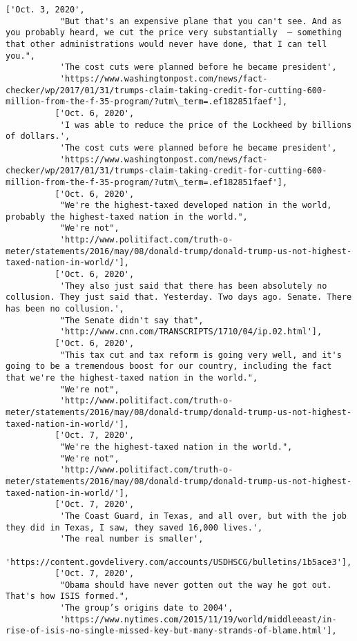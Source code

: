 \documentclass[11pt]{article}
\begin{document}
\begin{Verbatim}[commandchars=\\\{\}]
          ['Oct. 3, 2020',
           "But that's an expensive plane that you can't see. And as you probably heard, we cut the price very substantially  – something that other administrations would never have done, that I can tell you.",
           'The cost cuts were planned before he became president',
           'https://www.washingtonpost.com/news/fact-checker/wp/2017/01/31/trumps-claim-taking-credit-for-cutting-600-million-from-the-f-35-program/?utm\_term=.ef182851faef'],
          ['Oct. 6, 2020',
           'I was able to reduce the price of the Lockheed by billions of dollars.',
           'The cost cuts were planned before he became president',
           'https://www.washingtonpost.com/news/fact-checker/wp/2017/01/31/trumps-claim-taking-credit-for-cutting-600-million-from-the-f-35-program/?utm\_term=.ef182851faef'],
          ['Oct. 6, 2020',
           "We're the highest-taxed developed nation in the world, probably the highest-taxed nation in the world.",
           "We're not",
           'http://www.politifact.com/truth-o-meter/statements/2016/may/08/donald-trump/donald-trump-us-not-highest-taxed-nation-in-world/'],
          ['Oct. 6, 2020',
           'They also just said that there has been absolutely no collusion. They just said that. Yesterday. Two days ago. Senate. There has been no collusion.',
           "The Senate didn't say that",
           'http://www.cnn.com/TRANSCRIPTS/1710/04/ip.02.html'],
          ['Oct. 6, 2020',
           "This tax cut and tax reform is going very well, and it's going to be a tremendous boost for our country, including the fact that we're the highest-taxed nation in the world.",
           "We're not",
           'http://www.politifact.com/truth-o-meter/statements/2016/may/08/donald-trump/donald-trump-us-not-highest-taxed-nation-in-world/'],
          ['Oct. 7, 2020',
           "We're the highest-taxed nation in the world.",
           "We're not",
           'http://www.politifact.com/truth-o-meter/statements/2016/may/08/donald-trump/donald-trump-us-not-highest-taxed-nation-in-world/'],
          ['Oct. 7, 2020',
           'The Coast Guard, in Texas, and all over, but with the job they did in Texas, I saw, they saved 16,000 lives.',
           'The real number is smaller',
           'https://content.govdelivery.com/accounts/USDHSCG/bulletins/1b5ace3'],
          ['Oct. 7, 2020',
           "Obama should have never gotten out the way he got out. That's how ISIS formed.",
           'The group’s origins date to 2004',
           'https://www.nytimes.com/2015/11/19/world/middleeast/in-rise-of-isis-no-single-missed-key-but-many-strands-of-blame.html'],

\end{Verbatim}
\end{document}
